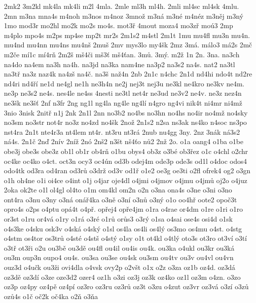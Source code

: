 {2mk2
3m2kl
mk4la
mk4li
m2l
4mla.
2mle
ml3h
ml4h.
2mli
ml4sc
ml4sk
4mlu.
2mn
m3na
mna4s
m4noh
m3nos
m4noz
3mno\v z
m3n\'a
m3n\'e
m4n\'ez
m3n\v ej
m3n\'y
1mo
mod3r
mo2hl
mo2k
mo2s
mo4s.
mot3\v r
4mout
moza4
mo3z\v r
mo\'u3
2mp
m4plo
mpo4s
m2ps
mp4se
mp2t
mr2s
2m1s2
m4stl
2m1t
1mu
mu4fl
mu3n
mu4n.
mu4nd
mu4nn
mu4ns
mu4n\v s
2mu\v s
2mv
mys3lo
my4\v sk
2mz
3m\'a.
m\'alo3
m\'a2s
2m\v c
m2\v ce
m\'i1c
m\'i4r\v n
2m2\v s
m\v s4\v ci
m\v s3\v t
m\v s4\v tan.
3m\r u.
3m\'y.
m2\v z
1n
2n.
3na.
na3ch
na4do
na4em
na3h
na4h.
na3jd
na3ka
nam4ne
na3p2
na3s2
na4s.
nat2
na3tl
na3t\v r
na3z
naz4k
na4z\v s
na4\v c.
na3\v s
na\v z4n
2nb
2n1c
n4chc
2n1d
nd4hi
ndo4t
nd2re
nd4ri
nd4\v r\'i
ne1d
ne4gl
ne1h
ne3h4n
ne2j
nej3t
nej3u
ne3kl
ne4kro
ne3kv
ne4m.
ne3p
ne3s2
ne4s.
nes4le
ne4ss
4nesti
ne3tl
net4r
ne3ud
ne3v2
ne4v.
ne3z
nez4n
ne3\v sk
ne3\v s\v t
2nf
n3fr
2ng
ng1l
ng4la
ng4le
ng4l\'i
n4gro
ng4vi
nik4t
ni4mr
ni4m\v z
3nio
3nisk
2nit\v r
n1j
2nk
2n1l
2nn
no3b2
no4bs
no3hn
no4hs
no4ir
no4m\v z
no4sky
no3sm
no3str
not4r
no3z
no4zd
no4\v sk
2no\v z
2n1s2
n2sa
ns3ak
ns4ko
n4soc
ns3po
nst4ra
2n1t
nte4r3a
nt4lem
nt4r.
nt3ru
nt3r\'a
2nub
nu4gg
3ny.
2nz
3n\'ak
n\'a3s2
n\'a4s.
2n1\v c
2n\v d
2n\'iv
2n\'i\v z
2n\'o
2n\v s2
n3\v st
n\v s4\v to
n\r u2
2n\v z
2o.
o1a
oang4
o1ba
o1be
obe3j
obe3s
obe3z
ob1l
ob1r
ob4r\v n
o1bu
obys4
ob3z
o3b\'e
ob3\v rez
o1c
o4chl
o2chr
oc4ke
oc4ko
o4ct.
oct3n
ocy3
oc4\'un
od3b
odej4m
ode3p
ode3s
od1l
o4doc
odos4
odo4tk
od3ra
od4ran
od3r\r u
o3dr\v z
od3v
od1\v r
o1e2
oe3g
oe3ti
o2fl
ofrek4
og2
o3gn
o1h
oh4ne
o1i
oi4ce
o4int
o1j
o4jar
oje4dl
o4jmi
o4jmov
o4jmu
o4jm\r u
oj2o
o4juz
2oka
ok2te
o1l
ol4gl
ol4to
o1m
om4kl
om2n
o2n
o3na
ona4s
o3ne
o3ni
o3no
ont4ra
o3nu
o3ny
o3n\'a
on\'a\v r4ka
o3n\v e
o3n\'i
o3n\r u
o3n\'y
o1o
oo4h\v r
oote2
opo\v c3t
opro4s
o2ps
o4ptu
op\'a4t
o4p\v r.
op\v rej4
op\v re4jm
o1ra
o4rae
or4dm
o1re
o1ri
o1ro
or3st
o1ru
or4v\'a
o1ry
o1r\'a
o3r\'e
o1r\r u
or\r us3
o3r\'y
o1sa
o4sai
ose4s
osi4d
o1sk
o4s3ke
o4sku
osk3v
o4sk\'a
o4sk\'y
o1sl
os4la
os4li
os4l\'y
os3mo
os4mu
o4st.
o4stg
o4stm
os4tor
os3tr\r u
o4st\'e
o4st\v s
o4st\'y
o1sy
o1t
ot4kl
o4tl\'y
oto3s
ot3ro
ot3v\'i
o3t\'i
o3t\v r
ot3\v ri
o2u
ou3b\v e
ou3d\v e
ou4fl
ou4il
ou4is
ou4k.
ou3ka
o4ukl
ou3kr
ou3k\'a
ou3m
oup3n
oupo4
ou4s.
ou3sa
ou3se
ou4sk
ou3sm
ou4tv
ou3v
ou4vl
ou4vn
ouz3d
o4u\v ck
ou3\v zi
ovi4dla
o4vsk
ovy2p
o2v\v st
o1x
o2z
o3za
oz1b
oz4d.
oz3d\'a
oz3d\v e
oz3d\'i
o3ze
oze3d2
ozer4
oz1h
o3zi
oz3j
oz3k
oz4ko
oz1l
oz3m
o4zn.
o3zo
oz3p
oz4py
oz4p\v e
oz4p\'i
oz3ro
oz3ru
oz3r\r u
oz3t
o3zu
o4zut
oz3vr
oz3v\'a
o3z\'i
o3z\r u
oz\r u4s
o1\v c
o\v c2k
o\v c4ka
o2\v n
o3\v na
}
